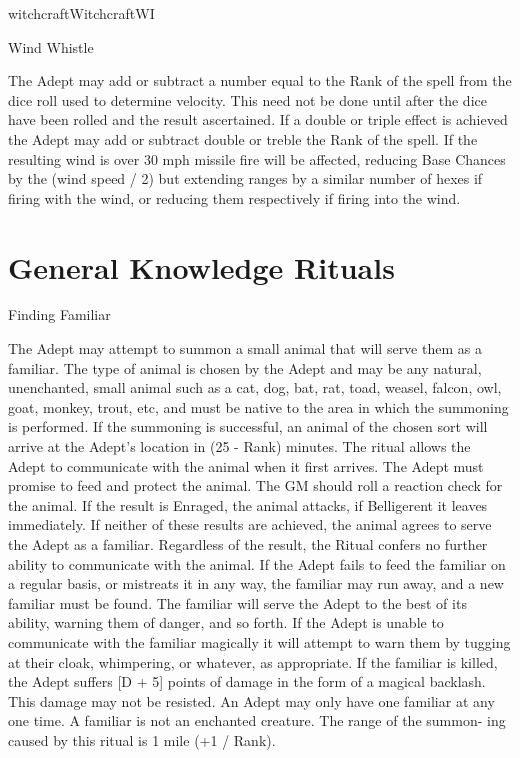 \begin{College}[1.1]{witchcraft}{Witchcraft}{WI}
\begin{spell}[G-13]{Wind Whistle}
\begin{effects}
The Adept may add or subtract a number equal to the Rank of the spell
from the dice roll used to determine velocity.  This need not be done
until after the dice have been rolled and the result ascertained.  If
a double or triple effect is achieved the Adept may add or subtract
double or treble the Rank of the spell.  If the resulting wind is over
30 mph missile fire will be affected, reducing Base Chances by the
(wind speed / 2) but extending ranges by a similar number of hexes if
firing with the wind, or reducing them respectively if firing into the
wind.
\end{effects}
\end{spell}

\section{General Knowledge Rituals}

\begin{ritual}[Q-1]{Finding Familiar}

\begin{effects}
The Adept may attempt to summon a small animal that will serve them as
a familiar. The type of animal is chosen by the Adept and may be any
natural, unenchanted, small animal such as a cat, dog, bat, rat, toad,
weasel, falcon, owl, goat, monkey, trout, etc, and must be native to
the area in which the summoning is performed.  If the summoning is
successful, an animal of the chosen sort will arrive at the Adept’s
location in (25 - Rank) minutes.  The ritual allows the Adept to
communicate with the animal when it first arrives.  The Adept must
promise to feed and protect the animal.  The GM should roll a reaction
check for the animal.  If the result is Enraged, the animal attacks,
if Belligerent it leaves immediately.  If neither of these results are
achieved, the animal agrees to serve the Adept as a familiar.
Regardless of the result, the Ritual confers no further ability to
communicate with the animal. If the Adept fails to feed the familiar
on a regular basis, or mistreats it in any way, the familiar may run
away, and a new familiar must be found.  The familiar will serve the
Adept to the best of its ability, warning them of danger, and so
forth.  If the Adept is unable to communicate with the familiar
magically it will attempt to warn them by tugging at their cloak,
whimpering, or whatever, as appropriate.  If the familiar is killed,
the Adept suffers [D + 5] points of damage in the form of a magical
backlash. This damage may not be resisted.  An Adept may only have one
familiar at any one time. A familiar is not an enchanted creature.
The range of the summon- ing caused by this ritual is 1 mile (+1 /
Rank).
\end{effects}
\end{ritual}


\end{College}
